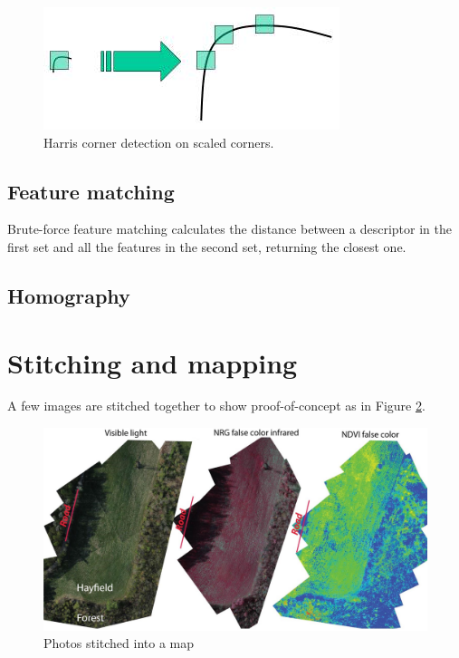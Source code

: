 \begin{figure}[H]
\centering
\includegraphics[scale=0.5]{images/sift_scale_invariant.jpg}
\caption{Harris corner detection on scaled corners. \cite{calib3d}}
\label{fig:sift_scale}
\end{figure}

\subsection{Feature matching}
Brute-force feature matching calculates the distance between a descriptor in the first set and all the features in the second set, returning the closest one.


\subsection{Homography}



\section{Stitching and mapping}

A few images are stitched together to show proof-of-concept as in Figure \ref{fig:stitch_map}.

\begin{figure}[H]
\centering
\includegraphics[scale=0.35]{images/ndvi_stitch_example.jpg}
\caption{Photos stitched into a map}
\label{fig:stitch_map}
\end{figure}

